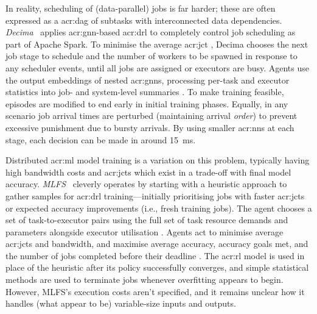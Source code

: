 In reality, scheduling of (data-parallel) jobs is far harder; these are often expressed as a \gls{acr:dag} of subtasks with interconnected data dependencies.
\emph{Decima}~\parencite{DBLP:conf/sigcomm/MaoSVMA19} applies \gls{acr:gnn}-based \gls{acr:drl} to completely control job scheduling as part of Apache Spark.
To minimise the average \gls{acr:jct} \prllitreward, Decima chooses the next job stage to schedule and the number of workers to be spawned \prllitact{} in response to any scheduler events, until all jobs are assigned or executors are busy.
Agents use the output embeddings of nested \glspl{acr:gnn}, processing per-task and executor statistics into job- and system-level summaries \prllitstate.
To make training feasible, episodes are modified to end early in initial training phases.
Equally, in any scenario job arrival times are perturbed (maintaining arrival \emph{order}) to prevent excessive punishment due to bursty arrivals.
By using smaller \glspl{acr:nn} at each stage, each decision can be made in around \qty{15}{\milli\second}.

Distributed \gls{acr:ml} model training is a variation on this problem, typically having high bandwidth costs and \glspl{acr:jct} which exist in a trade-off with final model accuracy.
\emph{MLFS}~\parencite{DBLP:conf/conext/0002LS20} cleverly operates by starting with a heuristic approach to gather samples for \gls{acr:drl} training---initially prioritising jobs with faster \glspl{acr:jct} or expected accuracy improvements (i.e., fresh training jobs).
The agent chooses a set of task-to-executor pairs \prllitact{} using the full set of task resource demands and parameters alongside executor utilisation \prllitstate.
Agents act to minimise average \glspl{acr:jct} and bandwidth, and maximise average accuracy, accuracy goals met, and the number of jobs completed before their deadline \prllitreward.
The \gls{acr:rl} model is used in place of the heuristic after its policy successfully converges, and simple statistical methods are used to terminate jobs whenever overfitting appears to begin.
However, MLFS's execution costs aren't specified, and it remains unclear how it handles (what appear to be) variable-size inputs and outputs.

